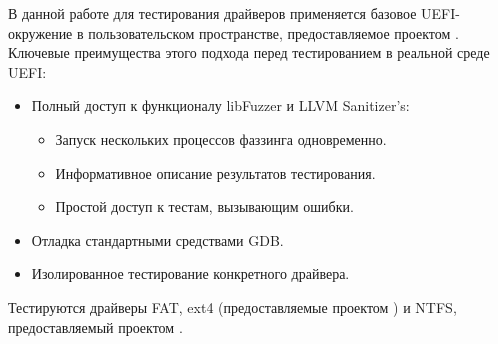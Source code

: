 В данной работе для тестирования драйверов применяется базовое UEFI-окружение в пользовательском пространстве, предоставляемое проектом  \cite{OpenCorePkg}. Ключевые преимущества этого подхода перед тестированием в реальной среде UEFI:
\begin{itemize}
	\item Полный доступ к функционалу libFuzzer и LLVM Sanitizer's:
	\begin{itemize}
		\item Запуск нескольких процессов фаззинга  одновременно.
		\item Информативное описание результатов тестирования.
		\item Простой доступ к тестам, вызывающим ошибки.
	\end{itemize}
	\item Отладка стандартными средствами GDB.
	\item Изолированное тестирование конкретного драйвера.
\end{itemize}
 
 Тестируются драйверы FAT, ext4 (предоставляемые проектом  \cite{Audk}) и NTFS, предоставляемый проектом \cite{OpenCorePkg}.  